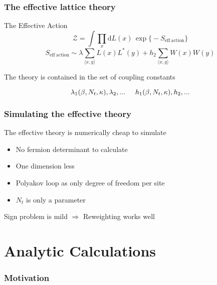 \documentclass[12pt,a4paper,dvipsnames,usenames]{beamer}
\begin{document}
\begin{frame}
  \frametitle{The effective lattice theory}

  \begin{alertblock}{The Effective Action}
    \[
      \mathcal{Z} = \int \prod_x \mathrm{d} L(x) \, \exp \big\{ \minus S_{\mathrm{eff \: action}} \big\}
    \]
    \[
      S_{\mathrm{eff \: action}} \sim \lambda \sum_{\langle x, y \rangle} L(x) L^*(y) + h_2\sum_{\langle x, y \rangle} W(x) W(y)
    \]
  \end{alertblock}

  \vspace{1em}

  The theory is contained in the set of coupling constants

  \[
    \lambda_1(\beta, N_t, \kappa), \lambda_2, ... \hspace{.5cm} h_1(\beta,N_t,\kappa), h_2, ...
  \]

\end{frame}

\begin{frame}
  \frametitle{Simulating the effective theory}

  The effective theory is numerically cheap to simulate

  \vspace{.5cm}

  \begin{itemize}
    \setlength\itemsep{.5em}
    \item No fermion determinant to calculate
    \item One dimension less
    \item Polyakov loop as only degree of freedom per site
    \item $N_t$ is only a parameter
  \end{itemize}

  \vspace{.5cm}

  Sign problem is mild \;$\Rightarrow$\; Reweighting works well
  
  
\end{frame}

\section{Analytic Calculations}
\sectionframe

\begin{frame}
  \frametitle{Motivation}

  {\centering
    
    \par}

  
\end{frame}
\end{document}
